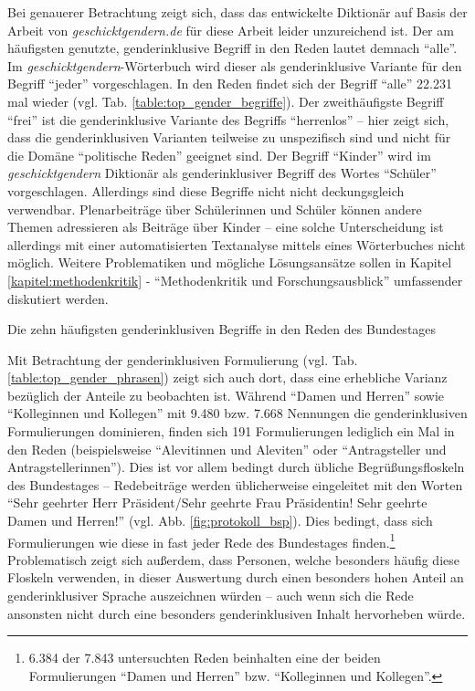 \documentclass[12pt, 
    twoside=false, 
    bibliography=totoc, 
    numbers=endperiod, 
    headings=normal, 
    toc=chapterentrydotfill
    ]{scrbook}
\begin{document}
Bei genauerer Betrachtung zeigt sich, dass das entwickelte Diktionär auf Basis der Arbeit von \emph{geschicktgendern.de} für diese Arbeit leider unzureichend ist. Der am häufigsten genutzte, genderinklusive Begriff in den Reden lautet demnach \enquote{alle}. Im \emph{geschicktgendern}-Wörterbuch wird dieser als genderinklusive Variante für den Begriff \enquote{jeder} vorgeschlagen. In den Reden findet sich der Begriff \enquote{alle} 22.231 mal wieder (vgl. Tab. \ref{table:top_gender_begriffe}). Der zweithäufigste Begriff \enquote{frei} ist die genderinklusive Variante des Begriffs \enquote{herrenlos} -- hier zeigt sich, dass die genderinklusiven Varianten teilweise zu unspezifisch sind und nicht für die Domäne \enquote{politische Reden} geeignet sind. Der Begriff \enquote{Kinder} wird im \emph{geschicktgendern} Diktionär als genderinklusiver Begriff des Wortes \enquote{Schüler} vorgeschlagen. Allerdings sind diese Begriffe nicht nicht deckungsgleich verwendbar. Plenarbeiträge über Schülerinnen und Schüler können andere Themen adressieren als Beiträge über Kinder -- eine solche Unterscheidung ist allerdings mit einer automatisierten Textanalyse mittels eines Wörterbuches nicht möglich. Weitere Problematiken und mögliche Lösungsansätze sollen in Kapitel \ref{kapitel:methodenkritik} - \enquote{Methodenkritik und Forschungsausblick} umfassender diskutiert werden. 

\begin{table}
    \centering
    \caption[Die zehn häufigsten genderinklusiven Begriffe in den Reden des Bundestages]{Die zehn häufigsten genderinklusiven Begriffe in den Reden des Bundestages}
    
    \label{table:top_gender_begriffe}
\end{table}

Mit Betrachtung der genderinklusiven Formulierung (vgl. Tab. \ref{table:top_gender_phrasen}) zeigt sich auch dort, dass eine erhebliche Varianz bezüglich der Anteile zu beobachten ist. Während \enquote{Damen und Herren} sowie \enquote{Kolleginnen und Kollegen} mit 9.480 bzw. 7.668 Nennungen die genderinklusiven Formulierungen dominieren, finden sich 191 Formulierungen lediglich ein Mal in den Reden (beispielsweise \enquote{Alevitinnen und Aleviten} oder \enquote{Antragsteller und Antragstellerinnen}). Dies ist vor allem bedingt durch übliche Begrüßungsfloskeln des Bundestages -- Redebeiträge werden üblicherweise eingeleitet mit den Worten \enquote{Sehr geehrter Herr Präsident/Sehr geehrte Frau Präsidentin! Sehr geehrte Damen und Herren!} (vgl. Abb. \ref{fig:protokoll_bsp}). Dies bedingt, dass sich Formulierungen wie diese in fast jeder Rede des Bundestages finden.\footnote{6.384 der 7.843 untersuchten Reden beinhalten eine der beiden Formulierungen \enquote{Damen und Herren} bzw. \enquote{Kolleginnen und Kollegen}.}
Problematisch zeigt sich außerdem, dass Personen, welche besonders häufig diese Floskeln verwenden, in dieser Auswertung durch einen besonders hohen Anteil an genderinklusiver Sprache auszeichnen würden -- auch wenn sich die Rede ansonsten nicht durch eine besonders genderinklusiven Inhalt hervorheben würde.
\end{document}
